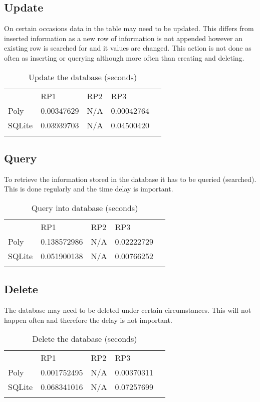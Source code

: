\subsection{Update}
On certain occasions data in the table may need to be updated. This differs from inserted information as a new row of information is not appended however an existing row is searched for and it values are changed. This action is not done as often as inserting or querying although more often than creating and deleting.
\begin{table}[!htb]
\centering

\label{Update}
\begin{tabular}{lllll}
     & RP1         & RP2 & RP3 &  \\
Poly & 0.00347629 & N/A    & 0.00042764    &  \\
SQLite  & 0.03939703 & N/A    & 0.04500420    &  \\
     &             &     &     & 
\end{tabular}
\caption{Update the database (seconds)}
\end{table}

\subsection{Query}
To retrieve the information stored in the database it has to be queried (searched). This is done regularly and the time delay is important.
\begin{table}[!htb]
\centering

\label{Query}
\begin{tabular}{lllll}
     & RP1         & RP2 & RP3 &  \\
Poly & 0.138572986 & N/A    & 0.02222729 &  \\
SQLite  & 0.051900138 & N/A    & 0.00766252 &  \\
     &             &     &     & 
\end{tabular}
\caption{Query into database (seconds)}
\end{table}

\subsection{Delete}
The database may need to be deleted under certain circumstances. This will not happen often and therefore the delay is not important.
\begin{table}[!htb]
\centering

\label{Delete}
\begin{tabular}{lllll}
     & RP1         & RP2 & RP3 &  \\
Poly & 0.001752495 & N/A    & 0.00370311    &  \\
SQLite  & 0.068341016 & N/A    & 0.07257699    &  \\
     &             &     &     & 
\end{tabular}
\caption{Delete the database (seconds)}
\end{table}


\iffalse
The chosen RPi we are using is ...
For this RPi this bar graph which seperate bar for each operation and shaded for SQLite and unshaded for poly.
\fi